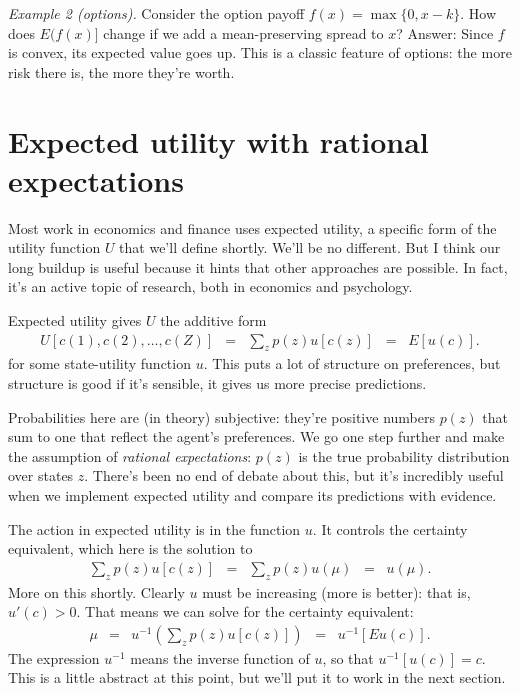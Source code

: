 \documentclass[11pt]{article}
\begin{document}
{\it Example 2 (options).\/}
Consider the option payoff $ f(x) = \max \{ 0, x-k \} $.
How does $E(f(x)]$ change if we add a mean-preserving spread to $x$?
Answer: Since $f$ is convex, its expected value goes up.
This is a classic feature of options:
the more risk there is, the more they're worth.



\section{Expected utility with rational expectations}

Most work in economics and finance uses expected utility,
a specific form of the utility function $U$ that we'll define shortly.
We'll be no different.
But I think our long buildup is useful because it hints
that other approaches are possible.
In fact, it's an active topic of research,
both in economics and psychology.

Expected utility gives $U$ the additive form
\begin{eqnarray}
    U [c(1), c(2), \ldots, c(Z)]
            &=& \sum_z p(z) u[c(z)]  \;\;=\;\;  E [u(c)] .
\end{eqnarray}
for some state-utility function $u$.
This puts a lot of structure on preferences,
but structure is good if it's sensible,
it gives us more precise predictions.


Probabilities here are (in theory) subjective:
they're positive numbers $p(z)$ that sum to one that reflect
the agent's preferences.
We go one step further and make the assumption
of {\it rational expectations\/}:
$p(z)$ is the true probability distribution over states $z$.
There's been no end of debate about this,
but it's incredibly useful when we implement
expected utility and compare its predictions with evidence.


The action in expected utility is in the function $u$.
It controls the certainty equivalent, which here is the solution to
\begin{eqnarray*}
    \sum_z p(z) u[c(z)]
        &=&  \sum_z p(z) u(\mu)  \;\;=\;\; u(\mu) .
\end{eqnarray*}
More on this shortly.
Clearly $u$ must be increasing (more is better):
that is, $u'(c) > 0$.
That means we can solve for the certainty equivalent:
\begin{eqnarray*}
    \mu &=& u^{-1} \left( \sum_z p(z) u[c(z)] \right)
        \;\;=\;\; u^{-1} \left[ E u(c) \right] .
\end{eqnarray*}
The expression $u^{-1}$ means the inverse function of $u$,
so that $u^{-1} [u(c)] = c $.
This is a little abstract at this point, but we'll put it to work
in the next section.
\end{document}
